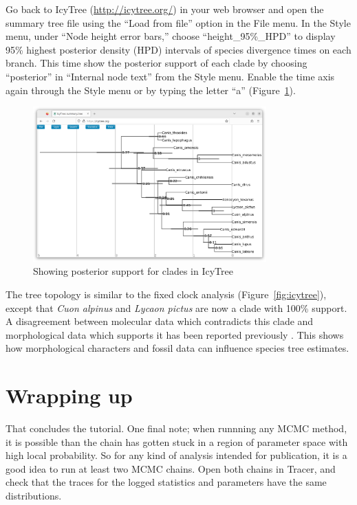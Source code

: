 \documentclass[12pt]{article}
\begin{document}
Go back to IcyTree (\url{http://icytree.org/}) in your web browser and open
the summary tree file using the ``Load from file'' option in the File menu.
In the Style menu, under ``Node height error bars,'' choose
``height\_95\%\_HPD'' to display 95\% highest posterior density
(HPD) intervals of species divergence times on each branch. This time show
the posterior support of each clade by choosing ``posterior'' in ``Internal node text''
from the Style menu. Enable the time axis again through the Style menu or by typing the
letter ``a'' (Figure~\ref{fig:sampledAncestorsIcyTree}).

\begin{figure}[htb!]
\centering
\includegraphics[width=0.8\textwidth]{figures/sampledAncestorsIcyTree.png}
\caption
{Showing posterior support for clades in IcyTree}
\label{fig:sampledAncestorsIcyTree}
\end{figure}

The tree topology is similar to the fixed clock analysis
(Figure~\ref{fig:icytree}), except that \textit{Cuon alpinus} and
\textit{Lycaon pictus} are now a clade with 100\% support. A disagreement
between molecular data which contradicts this clade and morphological
data which supports it has been reported previously \parencite{Zrzavy2004}. This shows
how morphological characters and fossil data can influence species tree
estimates.

\section{Wrapping up}

That concludes the tutorial. One final note; when runnning any MCMC method, it
is possible than the chain has gotten stuck in a region of parameter space
with high local probability. So for any kind of analysis intended for
publication, it is a good idea to run at least two MCMC chains. Open both
chains in Tracer, and check that the traces for the logged statistics and
parameters have the same distributions.

\clearpage

\printbibliography
\end{document}
